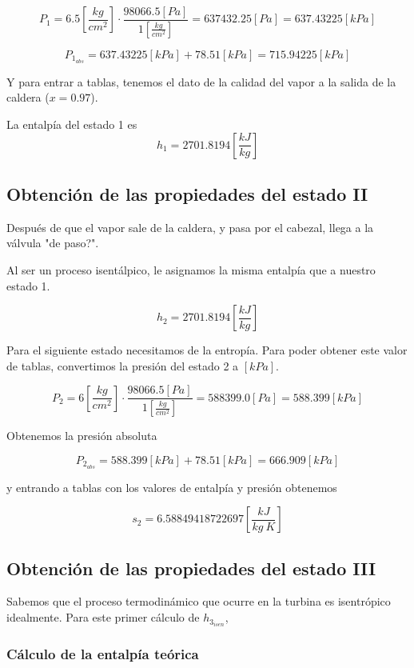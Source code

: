 \documentclass[12pt,letterpaper]{article}
\begin{document}
$$P_1 = 6.5\left[\frac{kg}{cm^2}\right] 
\cdot 
\frac{98066.5[Pa]}{1\left[\frac{kg}{cm^2}\right]}=637432.25[Pa]=637.43225[kPa]
$$

$$P_{1_{abs}} = 637.43225[kPa] + 78.51[kPa] = 715.94225[kPa]$$

Y para entrar a tablas, tenemos el dato de la calidad del vapor a la salida de la caldera ($x=0.97$).

La entalpía del estado 1 es
$$
    h_1 =  2701.8194 \left[\frac{kJ}{kg}\right]
$$

\subsection{Obtención de las propiedades del estado II} \label{sec:estadoII}

Después de que el vapor sale de la caldera, y pasa por el cabezal, llega a la válvula "de paso?".

Al ser un proceso isentálpico, le asignamos la misma entalpía que a nuestro estado 1.

$$
    h_2 =  2701.8194 \left[\frac{kJ}{kg}\right]
$$

Para el siguiente estado necesitamos de la entropía. Para poder obtener este valor de tablas, 
convertimos la presión del estado 2 a $[kPa]$.

$$P_2 = 6\left[\frac{kg}{cm^2}\right] 
\cdot 
\frac{98066.5[Pa]}{1\left[\frac{kg}{cm^2}\right]}=588399.0[Pa]=588.399[kPa]
$$

Obtenemos la presión absoluta

$$P_{2_{abs}} = 588.399[kPa] + 78.51[kPa] = 666.909[kPa]$$

y entrando a tablas con los valores de entalpía y presión obtenemos

$$
    s_2 = 6.58849418722697  \left[\frac{kJ}{kg\ K}\right]
$$

\subsection{Obtención de las propiedades del estado III} \label{sec:estadoIII}

Sabemos que el proceso termodinámico que ocurre en la turbina es isentrópico idealmente.
Para este primer cálculo de $h_{3_{isen}}$, 

\subsubsection{Cálculo de la entalpía teórica}
\end{document}
